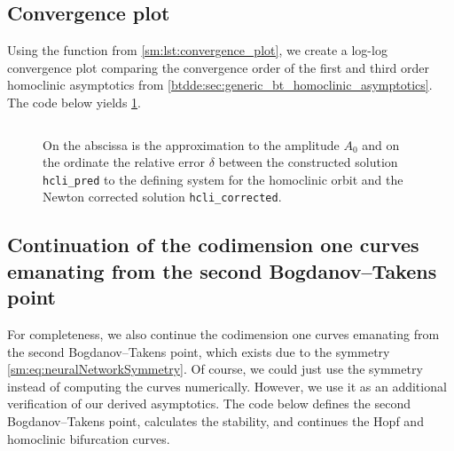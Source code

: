 \subsection{Convergence plot}
Using the function from \cref{sm:lst:convergence_plot}, we create a log-log
convergence plot comparing the convergence order of the first and third order
homoclinic asymptotics from \cref{btdde:sec:generic_bt_homoclinic_asymptotics}.
The code below yields \cref{sm:fig:NeuralNetworkConvergencePlot}.
\inputminted[firstline=176, lastline=187]{MATLAB}{\pathToDDEBifToolDemos/neural_network_model/neural_network_model.m}
\begin{figure}[ht]
    \centering
        \caption{On the abscissa is the approximation to the amplitude $A_0$ and on
        the ordinate the relative error $\delta$ between the constructed solution
        \texttt{hcli_pred} to the defining system for the homoclinic orbit
        and the Newton corrected solution \texttt{hcli_corrected}.}
    \label{sm:fig:NeuralNetworkConvergencePlot}
\end{figure}

\subsection{Continuation of the codimension one curves emanating from the second Bogdanov--Takens point}
For completeness, we also continue the codimension one curves emanating from
the second Bogdanov--Takens point, which exists due to the symmetry
\cref{sm:eq:neuralNetworkSymmetry}. Of course, we could just use the symmetry
instead of computing the curves numerically. However, we use it as an
additional verification of our derived asymptotics. The code below defines the
second Bogdanov--Takens point, calculates the stability, and continues the Hopf
and homoclinic bifurcation curves.
\inputminted[firstline=189, lastline=216]{MATLAB}{\pathToDDEBifToolDemos/neural_network_model/neural_network_model.m}

